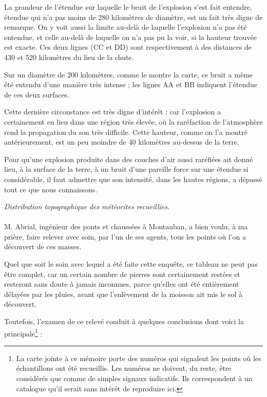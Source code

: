 \documentclass[a4paper, 11pt, oneside, polutonikogreek, french]{article}
\begin{document}
La grandeur de l'étendue sur laquelle le bruit de l'explosion s'est fait entendre, étendue qui n'a pas moins de 280 kilomètres de diamètre, est un fait très digne de remarque. On y voit aussi la limite au-delà de laquelle l'explosion n'a pas été entendue, et celle au-delà de laquelle on n'a pas pu la voir, si la hauteur trouvée est exacte. Ces deux lignes (CC et DD) sont respectivement à des distances de 430 et 520 kilomètres du lieu de la chute.

Sur un diamètre de 200 kilomètres, comme le montre la carte, ce bruit a même été entendu d'une manière très intense ; les lignes AA et BB indiquent l'étendue de ces deux surfaces.

Cette dernière circonstance est très digne d'intérêt ; car l'explosion a certainement eu lieu dans une région très élevée, où la raréfaction de l'atmosphère rend la propagation du son très difficile. Cette hauteur, comme on l'a montré antérieurement, est un peu moindre de 40 kilomètres au-dessus de la terre.

Pour qu'une explosion produite dans des couches d'air aussi raréfiées ait donné lieu, à la surface de la terre, à un bruit d'une pareille force sur une étendue si considérable, il faut admettre que son intensité, dans les hautes régions, a dépassé tout ce que nous connaissons.
\begin{center}
\emph{Distribution topographique des météorites recueillies.}
\end{center}
\paragraph{}
M. Abrial, ingénieur des ponts et chaussées à Montauban, a bien voulu, à ma prière, faire relever avec soin, par l'un de ses agents, tous les points où l'on a découvert de ces masses.

Quel que soit le soin avec lequel a été faite cette enquête, ce tableau ne peut pas être complet, car un certain nombre de pierres sont certainement restées et resteront sans doute à jamais inconnues, parce qu'elles ont été entièrement délayées par les pluies, avant que l'enlèvement de la moisson ait mis le sol à découvert.

Toutefois, l'examen de ce relevé conduit à quelques conclusions dont voici la principale\footnote{La carte jointe à ce mémoire porte des numéros qui signalent les points où les échantillons ont été recueillis. Les numéros ne doivent, du reste, être considérés que comme de simples signaux indicatifs. Ils correspondent à un catalogue qu'il serait sans intérêt de reproduire ici.} :
\end{document}
